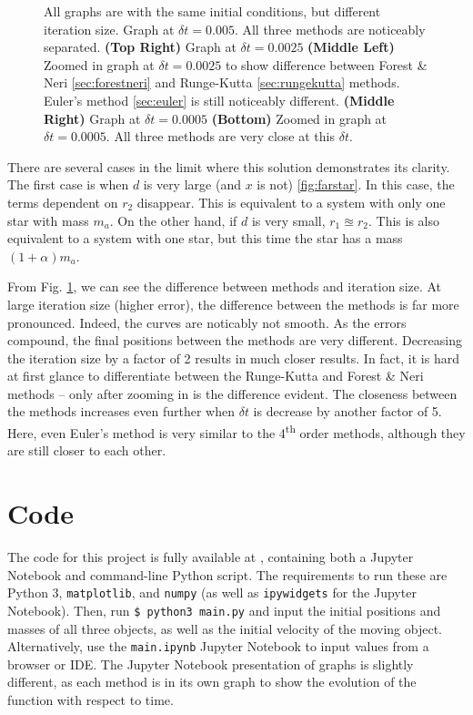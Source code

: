 \documentclass[preprint,titlepage,preprintnumbers,amsmath,amssymb,aps,11pt]{revtex4-2}
\begin{document}
\begin{figure}
    \caption{All graphs are with the same initial conditions, but different iteration size. Graph at $\delta t=0.005$. All three methods are noticeably separated. {\bf(Top Right)} Graph at $\delta t=0.0025$ {\bf(Middle Left)} Zoomed in graph at $\delta t=0.0025$ to show difference between Forest \& Neri \ref{sec:forestneri} and Runge-Kutta \ref{sec:rungekutta} methods. Euler's method \ref{sec:euler} is still noticeably different. {\bf(Middle Right)} Graph at $\delta t=0.0005$ {\bf(Bottom)} Zoomed in graph at $\delta t=0.0005$. All three methods are very close at this $\delta t$.}
    \label{fig:diffbetweenmethods}
\end{figure}


There are several cases in the limit where this solution demonstrates its clarity. The first case is when $d$ is very large (and $x$ is not) \ref{fig:farstar}. In this case, the terms dependent on $r_2$ disappear. This is equivalent to a system with only one star with mass $m_a$. On the other hand, if $d$ is very small, $r_1\approxeq r_2$. This is also equivalent to a system with one star, but this time the star has a mass $(1+\alpha)m_a$.

From Fig. \ref{fig:diffbetweenmethods}, we can see the difference between methods and iteration size. At large iteration size (higher error), the difference between the methods is far more pronounced. Indeed, the curves are noticably not smooth. As the errors compound, the final positions between the methods are very different. Decreasing the iteration size by a factor of 2 results in much closer results. In fact, it is hard at first glance to differentiate between the Runge-Kutta and Forest \& Neri methods -- only after zooming in is the difference evident. The closeness between the methods increases even further when $\delta t$ is decrease by another factor of 5. Here, even Euler's method is very similar to the 4\textsuperscript{th} order methods, although they are still closer to each other.


\appendix
\section{Code}\label{sec:code}
The code for this project is fully available at \href{https://github.com/jasperswallen/PHYS304-Project}{},
containing both a Jupyter Notebook and command-line Python script. The requirements to run these are Python 3, \texttt{matplotlib}, and \texttt{numpy} (as well as \texttt{ipywidgets} for the Jupyter Notebook). Then, run \texttt{\$ python3 main.py} and input the initial positions and masses of all three objects, as well as the initial velocity of the moving object. Alternatively, use the \texttt{main.ipynb} Jupyter Notebook to input values from a browser or IDE. The Jupyter Notebook presentation of graphs is slightly different, as each method is in its own graph to show the evolution of the function with respect to time.
\end{document}

